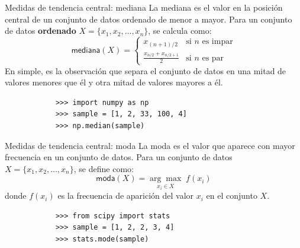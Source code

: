 \documentclass[aspectratio=169,handout]{beamer}
\begin{document}
    \begin{frame}[fragile]{Medidas de tendencia central: mediana}
        La mediana es el valor en la posición central de un conjunto de datos ordenado de menor a mayor. Para un conjunto de datos \textbf{ordenado} $X =\{x_1, x_2, \dots, x_n\}$, se calcula como:
        \begin{equation*}
            \textsf{mediana}(X) = \begin{cases} 
                x_{(n+1)/2} & \text{si $n$ es impar} \\
                \frac{x_{n/2} + x_{n/2+1}}{2} & \text{si $n$ es par} 
            \end{cases}
        \end{equation*}
        \pause
        En simple, es la observación que separa el conjunto de datos en una mitad de valores menores que él y otra mitad de valores mayores a él. 
        \pause
        \begin{verbatim}
            >>> import numpy as np
            >>> sample = [1, 2, 33, 100, 4]
            >>> np.median(sample)
        \end{verbatim}
    \end{frame}

    \begin{frame}[fragile]{Medidas de tendencia central: moda}
        La moda es el valor que aparece con mayor frecuencia en un conjunto de datos. Para un conjunto de datos $X =\{x_1, x_2, \dots, x_n\}$, se define como:
        \[
            \textsf{moda}(X) = \underset{x_i \in X}{\arg\max} \; f(x_i)
        \]
        donde $f(x_i)$ es la frecuencia de aparición del valor $x_i$ en el conjunto $X$.
        \pause
        \begin{verbatim}
            >>> from scipy import stats
            >>> sample = [1, 2, 2, 3, 4]
            >>> stats.mode(sample)
        \end{verbatim}
    \end{frame}
\end{document}
